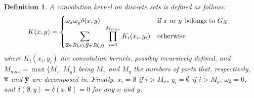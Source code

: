 \documentclass[twoside,11pt]{article}
\newtheorem{definition}{Definition}
\def\substr#1{{\bf\overline{#1}}}
\def\myinsert#1{#1}
\def\mysecondremove#1{}
\def\mysecondinsert#1{#1}
\def\LD#1{[{\color{blue}L}D] {\color{blue}#1}}
\begin{document}
\begin{definition}
\label{convolution_kernel_def}
A convolution kernel on discrete sets is defined as follows:
\begin{displaymath}
K(x,y) = 
\begin{cases}
\omega_x\omega_y \delta(x,y) & \text{if $x$ or $y$ \mysecondremove{can not be decomposed}\mysecondinsert{belongs to $G_X$}}\\
\displaystyle\sum_{\substr{x} \in R(x), \substr{y} \in R(y)} \displaystyle\prod_{i=1}^{M_{\myinsert{max}}} K_i(x_i,y_i)& \text{otherwise}
\end{cases}
\end{displaymath}
where $K_i(x_i,y_i)$ are convolution kernels, possibly recursively defined\myinsert{, and $M_{max}=\max\{M_x,M_y\}$ being $M_x$ and $M_y$ the numbers of parts that, respectively, $\substr{x}$ and $\substr{y}$ are decomposed in. Finally, $x_i=\emptyset$ if $i>M_x$, $y_i=\emptyset$ if $i>M_y$}, \mysecondinsert{$\omega_{\emptyset}=0$, and $\delta(\emptyset,y)=\delta(x,\emptyset)=0$ for any $x$ and $y$}.
\end{definition}



\end{document}
